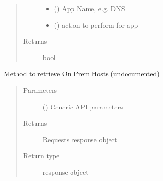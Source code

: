 \documentclass[letterpaper,10pt,english]{sphinxmanual}
\begin{document}
\begin{fulllineitems}
\begin{fulllineitems}
\begin{quote}
\begin{description}
\begin{itemize}
\item {} 
\sphinxAtStartPar
{} () \textendash{} App Name, e.g. DNS

\item {} 
\sphinxAtStartPar
{} () \textendash{} action to perform for app

\end{itemize}

\item[{Returns}] \leavevmode
\sphinxAtStartPar
bool

\end{description}\end{quote}

\end{fulllineitems}


\begin{fulllineitems}
\label{\detokenize{b1oph-class:bloxone.b1oph.on_prem_hosts}}
\sphinxAtStartPar
Method to retrieve On Prem Hosts
(undocumented)
\begin{quote}\begin{description}
\item[{Parameters}] \leavevmode
\sphinxAtStartPar
{} () \textendash{} Generic API parameters

\item[{Returns}] \leavevmode
\sphinxAtStartPar
Requests response object

\item[{Return type}] \leavevmode
\sphinxAtStartPar
response object

\end{description}\end{quote}

\end{fulllineitems}



\end{fulllineitems}
\end{document}
